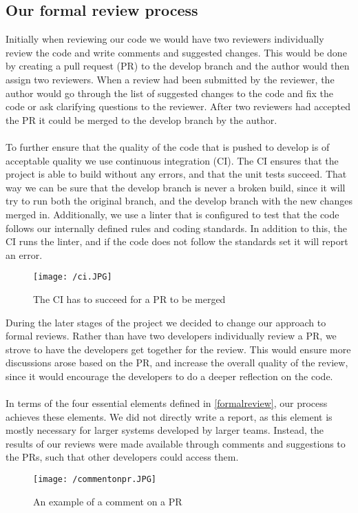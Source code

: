 \subsection{Our formal review process}
Initially when reviewing our code we would have two reviewers individually review the code and write comments and suggested changes. 
This would be done by creating a pull request (PR) to the develop branch and the author would then assign two reviewers.
When a review had been submitted by the reviewer, the author would go through the list of suggested changes to the code and fix the code or ask clarifying questions to the reviewer.
After two reviewers had accepted the PR it could be merged to the develop branch by the author. 
\\\\
To further ensure that the quality of the code that is pushed to develop is of acceptable quality we use continuous integration (CI).
The CI ensures that the project is able to build without any errors, and that the unit tests succeed. 
That way we can be sure that the develop branch is never a broken build, since it will try to run both the original branch, and the develop branch with the new changes merged in.
Additionally, we use a linter that is configured to test that the code follows our internally defined rules and coding standards. 
In addition to this, the CI runs the linter, and if the code does not follow the standards set it will report an error.
\begin{figure}[H]
    \texttt{[image: /ci.JPG]}
    \caption{The CI has to succeed for a PR to be merged}
    \label{fig:continous-integration}
\end{figure}
\noindent
During the later stages of the project we decided to change our approach to formal reviews.
Rather than have two developers individually review a PR, we strove to have the developers get together for the review.
This would ensure more discussions arose based on the PR, and increase the overall quality of the review, since it would encourage the developers to do a deeper reflection on the code.
\\\\
In terms of the four essential elements defined in \autoref{formalreview}, our process achieves these elements.
We did not directly write a report, as this element is mostly necessary for larger systems developed by larger teams.
Instead, the results of our reviews were made available through comments and suggestions to the PRs, such that other developers could access them.
\begin{figure}[H]
    \texttt{[image: /commentonpr.JPG]}
    \caption{An example of a comment on a PR}
    \label{fig:comment-on-pr}
\end{figure}
